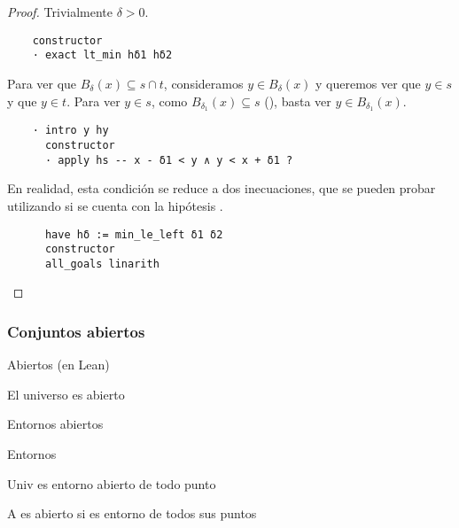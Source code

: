 \begin{proof}
  Trivialmente $\delta > 0$.
  
  \begin{lstlisting}
    constructor
    · exact lt_min hδ1 hδ2 \end{lstlisting}

  Para ver que $B_\delta (x) \subseteq s \cap t$, consideramos $y \in B_\delta(x)$ y queremos ver que $y \in s$ y que $y \in t$. Para ver $y \in s$, como $B_{\delta_1}(x) \subseteq s$ (), basta ver $y \in B_{\delta_1}(x)$.

  \begin{lstlisting}
    · intro y hy
      constructor
      · apply hs -- x - δ1 < y ∧ y < x + δ1 ? \end{lstlisting}

  En realidad, esta condición se reduce a dos inecuaciones, que se pueden probar utilizando  si se cuenta con la hipótesis .

  \begin{lstlisting}
      have hδ := min_le_left δ1 δ2
      constructor
      all_goals linarith \end{lstlisting}



    
  
  
\end{proof}


\subsubsection{Conjuntos abiertos}

\begin{definition}
    Abiertos (en Lean)
\end{definition}

\begin{example}
    El universo es abierto
\end{example}

\begin{definition}
    Entornos abiertos
\end{definition}

\begin{definition}
    Entornos
\end{definition}

\begin{example}
    Univ es entorno abierto de todo punto
\end{example}

\begin{proposition}
    A es abierto si es entorno de todos sus puntos
\end{proposition}


